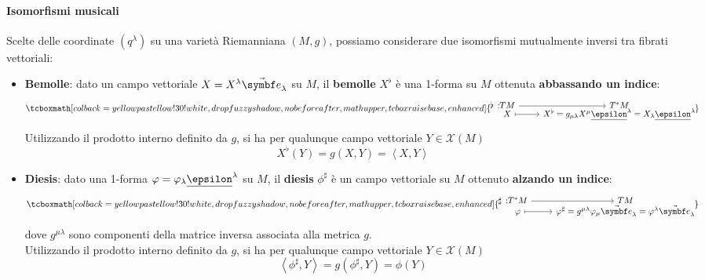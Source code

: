 \paragraph{Isomorfismi musicali}
Scelte delle coordinate $\left(q^\lambda\right)$ su una varietà Riemanniana $(M,g)$, possiamo considerare due isomorfismi mutualmente inversi tra fibrati vettoriali:
\begin{itemize}
	\item \textbf{Bemolle}: dato un campo vettoriale $X=X^\lambda\vba{e}_\lambda$ su $M$, il \textbf{bemolle} $X^\flat$ è una 1-forma su $M$ ottenuta \textbf{abbassando un indice}:
	\begin{equation}
		\tcboxmath[colback=yellowpastellow!30!white,drop fuzzy shadow, nobeforeafter, math upper, tcbox raise base, enhanced]{\funztot[\flat]{TM}{T^\ast M}{X}{X^{\flat}=g_{\mu\lambda}X^{\mu}\fb{\epsilon}^\lambda=X_{\lambda}\fb{\epsilon}^\lambda}}
	\end{equation}
	Utilizzando il prodotto interno definito da $g$, si ha per qualunque campo vettoriale $Y\in\mathcal{X}(M)$
	\begin{equation*}
		X^\flat(Y)=g(X,Y)=\left<X,Y\right>
	\end{equation*}
\item \textbf{Diesis}: dato una 1-forma $\phi=\phi_\lambda\fb{\epsilon}^\lambda$ su $M$, il \textbf{diesis} $\phi^\sharp$ è un campo vettoriale su $M$ ottenuto \textbf{alzando un indice}:
\begin{equation}
	\tcboxmath[colback=yellowpastellow!30!white,drop fuzzy shadow, nobeforeafter, math upper, tcbox raise base, enhanced]{\funztot[\sharp]{T^\ast M}{TM}{\phi}{\phi^{\sharp}=g^{\mu\lambda}\phi_{\mu}\vba{e}_\lambda=\phi^{\lambda}\vba{e}_\lambda}}
\end{equation}
dove $g^{\mu\lambda}$ sono componenti della matrice inversa associata alla metrica $g$.\\
Utilizzando il prodotto interno definito da $g$, si ha per qualunque campo vettoriale $Y\in\mathcal{X}(M)$
\begin{equation*}
	\left<\phi^\sharp,Y\right>=g(\phi^\sharp,Y)=\phi(Y)
\end{equation*}
\end{itemize}
